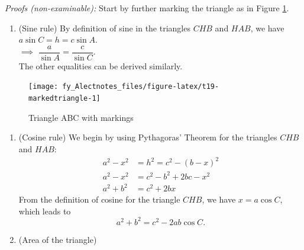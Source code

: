 \documentclass[
  12pt,
  oneside]{book}
\providecommand{\tightlist}{%
  \setlength{\itemsep}{0pt}\setlength{\parskip}{0pt}}
\theoremstyle{definition}
\theoremstyle{definition}
\theoremstyle{definition}
\theoremstyle{definition}
\theoremstyle{remark}
\begin{document}
\emph{Proofs (non-examinable):} Start by further marking the triangle as in Figure \ref{fig:t19-markedtriangle}.

\begin{enumerate}
\def\labelenumi{\arabic{enumi}.}
\tightlist
\item
  (Sine rule) By definition of sine in the triangles \(CHB\) and \(HAB\), we have \(a\sin C=h=c\sin A\).\\
  \(\implies\) \(\dfrac{a}{\sin A}=\dfrac{c}{\sin C}\).\\
  The other equalities can be derived similarly.
\end{enumerate}

\begin{figure}

{\centering \texttt{[image: fy\_Alectnotes\_files/figure-latex/t19-markedtriangle-1]} 

}

\caption{Triangle ABC with markings}\label{fig:t19-markedtriangle}
\end{figure}

\begin{enumerate}
\def\labelenumi{\arabic{enumi}.}
\setcounter{enumi}{1}
\item
  (Cosine rule) We begin by using Pythagoras' Theorem for the triangles \(CHB\) and \(HAB\):
  \begin{align*}
  a^2-x^2 &= h^2 = c^2-(b-x)^2\\
  a^2-x^2 &=c^2-b^2+2bc - x^2\\
  a^2+b^2 &= c^2+2bx
  \end{align*}
  From the definition of cosine for the triangle \(CHB\), we have \(x=a\cos C\), which leads to
  \[
  a^2+b^2=c^2-2ab\cos C.
  \]
\item
  (Area of the triangle)
\end{enumerate}
\end{document}

